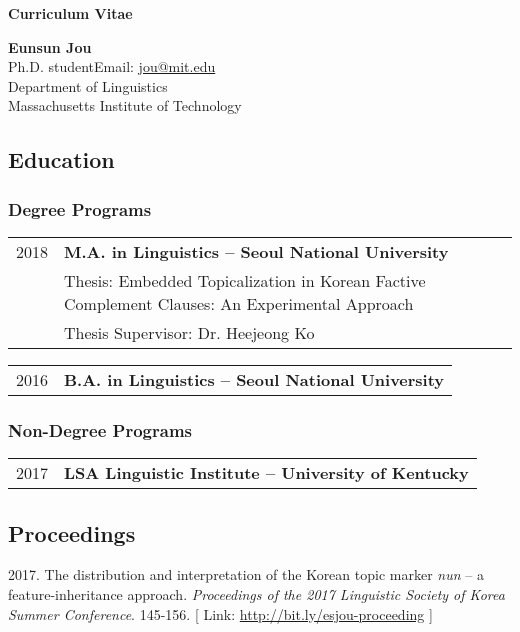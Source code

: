 \documentclass[12pt]{article}
\begin{document}
\begin{center}
{\Large \textbf{Curriculum Vitae}}
\end{center}

\thispagestyle{firstpage}

{\Large \textbf{Eunsun Jou}}\\
Ph.D. student{\hfill}{Email: \href{mailto:jou@mit.edu}{jou@mit.edu}}\\
Department of Linguistics\\
Massachusetts Institute of Technology{\hfill}{}

\subsection*{Education}
\subsubsection*{Degree Programs}
\begin{tabular}{p{}|p{}}
	{2018}&{\textbf{M.A. in Linguistics -- Seoul National University}}\\
	{}&{Thesis: Embedded Topicalization in Korean Factive Complement Clauses: An Experimental Approach}\\
	{}&{Thesis Supervisor: Dr. Heejeong Ko}\\
 \end{tabular}
{\linebreak}
{\linebreak}
\begin{tabular}{p{}|p{}}
   {2016}&{\textbf{B.A. in Linguistics -- Seoul National University}}\\
\end{tabular}

\subsubsection*{Non-Degree Programs}
\begin{tabular}{p{}|p{}}
	{2017}&{\textbf{LSA Linguistic Institute -- University of Kentucky}}\\
\end{tabular}

{\null}
\subsection*{Proceedings}
{2017. The distribution and interpretation of the Korean topic marker \textit{nun} -- a feature-inheritance approach. \textit{Proceedings of the 2017 Linguistic Society of Korea Summer Conference}. 145-156. [ Link: {\href{https://www.dropbox.com/s/07r9r0tsg7p9j4t/EunsunJou-LSK.pdf?dl=0}{http://bit.ly/esjou-proceeding}} ]}
\end{document}
